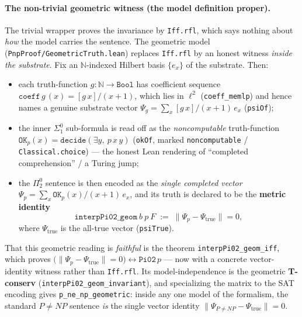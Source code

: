 \documentclass[11pt,a4paper]{report}
\begin{document}
\paragraph{The non-trivial geometric witness (the model definition proper).} The
trivial wrapper proves the invariance by \texttt{Iff.rfl}, which says nothing
about \emph{how} the model carries the sentence. The geometric model
(\texttt{PnpProof/GeometricTruth.lean}) replaces \texttt{Iff.rfl} by an honest
witness \emph{inside the substrate}. Fix an \(\mathbb{N}\)-indexed Hilbert basis
\(\{e_x\}\) of the substrate. Then:
\begin{itemize}
\item
  each truth-function \(g\colon \mathbb{N} \to \texttt{Bool}\) has coefficient
  sequence \(\texttt{coeff}\,g\,(x) = [g\,x]/(x+1)\), which lies in \(\ell^2\)
  (\texttt{coeff\_memlp}) and hence names a genuine substrate vector
  \(\Psi_g = \sum_x [g\,x]/(x+1)\,e_x\) (\texttt{psiOf});
\item
  the inner \(\Sigma^0_1\) sub-formula is read off as the \emph{noncomputable}
  truth-function \(\texttt{OK}_p(x) = \texttt{decide}(\exists y,\ p\,x\,y)\)
  (\texttt{okOf}, marked \texttt{noncomputable} / \texttt{Classical.choice}) ---
  the honest Lean rendering of ``completed comprehension'' / a Turing jump;
\item
  the \(\Pi^0_2\) sentence is then encoded as the \emph{single completed vector}
  \(\Psi_p = \sum_x \texttt{OK}_p(x)/(x+1)\,e_x\), and its truth is declared to be
  the \textbf{metric identity}
  \[
    \texttt{interpPi02\_geom}\ b\ p\ F \;:=\; \bigl\lVert \Psi_p - \Psi_{\mathrm{true}} \bigr\rVert = 0,
  \]
  where \(\Psi_{\mathrm{true}}\) is the all-true vector (\texttt{psiTrue}).
\end{itemize}
That this geometric reading is \emph{faithful} is the theorem
\texttt{interpPi02\_geom\_iff}, which proves
\(\bigl(\lVert \Psi_p - \Psi_{\mathrm{true}}\rVert = 0\bigr) \leftrightarrow \texttt{Pi02}\,p\)
--- now with a concrete vector-identity witness rather than \texttt{Iff.rfl}. Its
model-independence is the geometric \textbf{T-conserv}
(\texttt{interpPi02\_geom\_invariant}), and specializing the matrix to the SAT
encoding gives \texttt{p\_ne\_np\_geometric}: inside any one model of the
formalism, the standard \(P \neq NP\) sentence \emph{is} the single vector
identity \(\lVert \Psi_{P\neq NP} - \Psi_{\mathrm{true}}\rVert = 0\).
\end{document}
